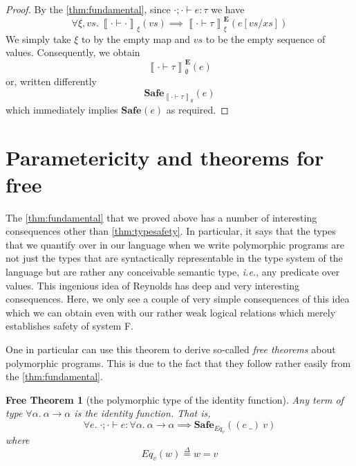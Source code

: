 \documentclass{article}
\newcommand{\ie}{\textit{i.e.}}
\newcommand{\defeq}{\overset{\Delta}{=}}
\newcommand{\semtyp}[3]{\left\llbracket #2 \vdash #3 \right\rrbracket_{#1}}
\newcommand{\semErel}[1]{#1^{\textbf{E}}}
\newcommand{\semenv}{\xi}
\newcommand{\TArg}{\_}
\newcommand{\expr}{e}
\newcommand{\val}{v}
\newcommand{\valB}{w}
\newcommand{\typ}{\tau}
\newcommand{\tvar}{\alpha}
\newcommand{\typed}[4]{#1; #2 \vdash #3 : #4}
\newcommand{\Safe}[1]{\textbf{Safe}_{#1}}
\begin{document}
\begin{proof}
  By the \ref{thm:fundamental}, since $\typed{\cdot}{\cdot}{\expr}{\typ}$ we have
  \[ \forall \semenv, \mathit{vs}. ~\semtyp{\semenv}{\cdot}{\cdot}(\mathit{vs}) \implies
    \semErel{\semtyp{\semenv}{\cdot}{\typ}}(\expr[\mathit{vs}/\mathit{xs}]) \]
  We simply take $\semenv$ to by the empty map and $\mathit{vs}$ to be the empty sequence of values.
  Consequently, we obtain
  \[ \semErel{\semtyp{\emptyset}{\cdot}{\typ}}(\expr) \]
  or, written differently
  \[ \Safe{\semtyp{\emptyset}{\cdot}{\typ}}(\expr) \]
  which immediately implies $\Safe{}(\expr)$ as required.
\end{proof}

\section{Parametericity and theorems for free}
The \ref{thm:fundamental} that we proved above has a number of interesting consequences other than \ref{thm:typesafety}.
In particular, it says that the types that we quantify over in our language when we write polymorphic programs are not just the types that are syntactically representable in the type system of the language but are rather any conceivable semantic type, \ie{}, any predicate over values.
This ingenious idea of Reynolds has deep and very interesting consequences.
Here, we only see a couple of very simple consequences of this idea which we can obtain even with our rather weak logical relations which merely establishes safety of system F.

One in particular can use this theorem to derive so-called \emph{free theorems} about polymorphic programs.
This is due to the fact that they follow rather easily from the \ref{thm:fundamental}.

\newtheorem{freetheorem}{Free Theorem}

\begin{freetheorem}[the polymorphic type of the identity function]
Any term of type $\forall \tvar.~\tvar \to \tvar$ is the identity function. That is,
\[
\forall \expr.\; \typed{\cdot}{\cdot}{\expr}{\forall \tvar.~\tvar \to \tvar} \implies \Safe{\mathit{Eq}_{\val}}((\expr~\TArg)~\val)
\]
where
\[ \mathit{Eq}_{\val}(\valB) \defeq{} \valB = \val \]
\end{freetheorem}
\end{document}
